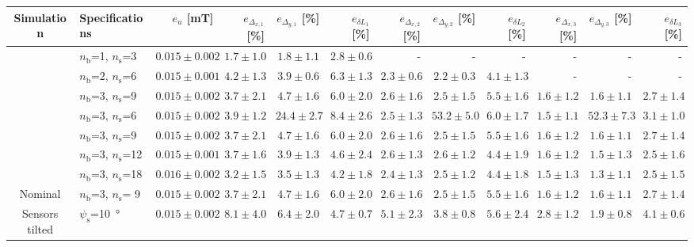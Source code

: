 \begin{landscape}
\begin{table}[hbt]
\begin{tabular}{cl r rrr rrr rrr}\toprule
\textbf{Simulation} & \textbf{Specifications} & $e_{u}$ [mT] & $e_{\Delta_{x,1}}$ [\%] & $e_{\Delta_{y,1}}$ [\%] & $e_{\delta L_1}$ [\%] & $e_{\Delta_{x,2}}$ [\%] & $e_{\Delta_{y,2}}$ [\%] & $e_{\delta L_2}$ [\%] & $e_{\Delta_{x,3}}$ [\%] & $e_{\Delta_{y,3}}$ [\%] & $e_{\delta L_3}$ [\%]\\
\midrule
{} & $n_\mathrm{b}$=1, $n_\mathrm{s}$=3 & $0.015 \pm 0.002$ & $1.7 \pm 1.0$ & $1.8 \pm 1.1$ & $2.8 \pm 0.6$ & - & - & - & - & - & -\\
& $n_\mathrm{b}$=2, $n_\mathrm{s}$=6 & $0.015 \pm 0.001$ & $4.2 \pm 1.3$ & $3.9 \pm 0.6$ & $6.3 \pm 1.3$ & $2.3 \pm 0.6$ & $2.2 \pm 0.3$ & $4.1 \pm 1.3$ & - & - & -\\
& $n_\mathrm{b}$=3, $n_\mathrm{s}$=9 & $0.015 \pm 0.002$ & $3.7 \pm 2.1$ & $4.7 \pm 1.6$ & $6.0 \pm 2.0$ & $2.6 \pm 1.6$ & $2.5 \pm 1.5$ & $5.5 \pm 1.6$ & $1.6 \pm 1.2$ & $1.6 \pm 1.1$ & $2.7 \pm 1.4$\\
\midrule
{} &$n_\mathrm{b}$=3, $n_\mathrm{s}$=6 & $0.015 \pm 0.002$ & $3.9 \pm 1.2$ & $24.4 \pm 2.7$ & $8.4 \pm 2.6$ & $2.5 \pm 1.3$ & $53.2 \pm 5.0$ & $6.0 \pm 1.7$ & $1.5 \pm 1.1$ & $52.3 \pm 7.3$ & $3.1 \pm 1.0$\\
&$n_\mathrm{b}$=3, $n_\mathrm{s}$=9 & $0.015 \pm 0.002$ & $3.7 \pm 2.1$ & $4.7 \pm 1.6$ & $6.0 \pm 2.0$ & $2.6 \pm 1.6$ & $2.5 \pm 1.5$ & $5.5 \pm 1.6$ & $1.6 \pm 1.2$ & $1.6 \pm 1.1$ & $2.7 \pm 1.4$\\
&$n_\mathrm{b}$=3, $n_\mathrm{s}$=12 & $0.015 \pm 0.001$ & $3.7 \pm 1.6$ & $3.9 \pm 1.3$ & $4.6 \pm 2.4$ & $2.6 \pm 1.3$ & $2.6 \pm 1.2$ & $4.4 \pm 1.9$ & $1.6 \pm 1.2$ & $1.5 \pm 1.3$ & $2.5 \pm 1.6$\\
&$n_\mathrm{b}$=3, $n_\mathrm{s}$=18 & $0.016 \pm 0.002$ & $3.2 \pm 1.5$ & $3.5 \pm 1.3$ & $4.2 \pm 1.8$ & $2.4 \pm 1.3$ & $2.5 \pm 1.2$ & $4.4 \pm 1.8$ & $1.5 \pm 1.3$ & $1.3 \pm 1.1$ & $2.5 \pm 1.5$\\
\midrule
Nominal & $n_\mathrm{b}$=3, $n_\mathrm{s}$= 9 & $0.015 \pm 0.002$ & $3.7 \pm 2.1$ & $4.7 \pm 1.6$ & $6.0 \pm 2.0$ & $2.6 \pm 1.6$ & $2.5 \pm 1.5$ & $5.5 \pm 1.6$ & $1.6 \pm 1.2$ & $1.6 \pm 1.1$ & $2.7 \pm 1.4$\\
Sensors tilted & $\psi_\mathrm{s}$=\SI{10}{\degree} & $0.015 \pm 0.002$ & $8.1 \pm 4.0$ & $6.4 \pm 2.0$ & $4.7 \pm 0.7$ & $5.1 \pm 2.3$ & $3.8 \pm 0.8$ & $5.6 \pm 2.4$ & $2.8 \pm 1.2$ & $1.9 \pm 0.8$ & $4.1 \pm 0.6$\\

\end{tabular}
\end{table}
\end{landscape}
